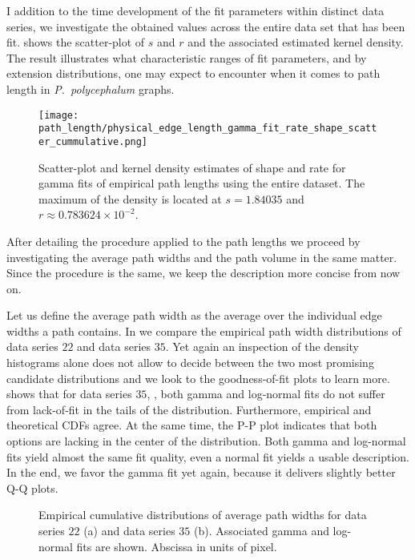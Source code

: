 		I addition to the time development of the fit parameters within distinct data series, we investigate the obtained values across the entire data set that has been fit.  shows the scatter-plot of $s$ and $r$ and the associated estimated kernel density. The result illustrates what characteristic ranges of fit parameters, and by extension distributions, one may expect to encounter when it comes to path length in \emph{P.~polycephalum} graphs.

		\begin{figure}[!htbp]
			\centering
				\texttt{[image: path\_length/physical\_edge\_length\_gamma\_fit\_rate\_shape\_scatter\_cummulative.png]}
			\caption[Path length distribution fit parameter densities.]{Scatter-plot and kernel density estimates of shape and rate for gamma fits of empirical path lengths using the entire dataset. The maximum of the density is located at $s = 1.84035$ and $r \approx 0.783624 \times 10^{-2}$.}
			\label{fig:path_lengths_gamma_fit_kde}
		\end{figure}

		After detailing the procedure applied to the path lengths we proceed by investigating the average path widths and the path volume in the same matter. Since the procedure is the same, we keep the description more concise from now on.

		Let us define the average path width as the average over the individual edge widths a path contains. In  we compare the empirical path width distributions of data series $22$ and data series $35$. Yet again an inspection of the density histograms alone does not allow to decide between the two most promising candidate distributions and we look to the goodness-of-fit plots to learn more.  shows that for data series $35$, , both gamma and log-normal fits do not suffer from lack-of-fit in the tails of the distribution. Furthermore, empirical and theoretical CDFs agree. At the same time, the P-P plot indicates that both options are lacking in the center of the distribution. Both gamma and log-normal fits yield almost the same fit quality, even a normal fit yields a usable description. In the end, we favor the gamma fit yet again, because it delivers slightly better Q-Q plots. 

		\begin{figure}
			\centering

			\caption[Path width distributions.]{Empirical cumulative distributions of average path widths for data series $22$ (a) and data series $35$ (b). Associated gamma and log-normal fits are shown. Abscissa in units of pixel.}
			\label{fig:path_widths}
		\end{figure}

